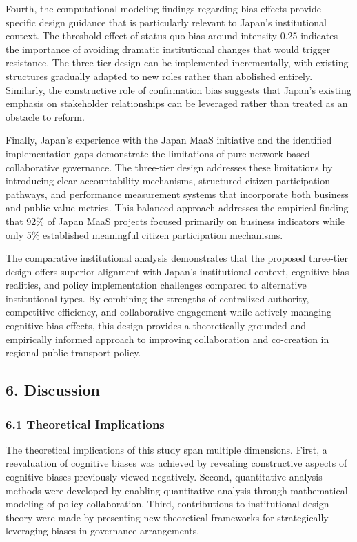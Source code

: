 Fourth, the computational modeling findings regarding bias effects
provide specific design guidance that is particularly relevant to
Japan's institutional context. The threshold effect of status quo bias
around intensity 0.25 indicates the importance of avoiding dramatic
institutional changes that would trigger resistance. The three-tier
design can be implemented incrementally, with existing structures
gradually adapted to new roles rather than abolished entirely.
Similarly, the constructive role of confirmation bias suggests that
Japan's existing emphasis on stakeholder relationships can be leveraged
rather than treated as an obstacle to reform.

Finally, Japan's experience with the Japan MaaS initiative and the
identified implementation gaps demonstrate the limitations of pure
network-based collaborative governance. The three-tier design addresses
these limitations by introducing clear accountability mechanisms,
structured citizen participation pathways, and performance measurement
systems that incorporate both business and public value metrics. This
balanced approach addresses the empirical finding that 92\% of Japan
MaaS projects focused primarily on business indicators while only 5\%
established meaningful citizen participation mechanisms.

The comparative institutional analysis demonstrates that the proposed
three-tier design offers superior alignment with Japan's institutional
context, cognitive bias realities, and policy implementation challenges
compared to alternative institutional types. By combining the strengths
of centralized authority, competitive efficiency, and collaborative
engagement while actively managing cognitive bias effects, this design
provides a theoretically grounded and empirically informed approach to
improving collaboration and co-creation in regional public transport
policy.

\subsection{6. Discussion}\label{discussion}

\subsubsection{6.1 Theoretical
Implications}\label{theoretical-implications}

The theoretical implications of this study span multiple dimensions.
First, a reevaluation of cognitive biases was achieved by revealing
constructive aspects of cognitive biases previously viewed negatively.
Second, quantitative analysis methods were developed by enabling
quantitative analysis through mathematical modeling of policy
collaboration. Third, contributions to institutional design theory were
made by presenting new theoretical frameworks for strategically
leveraging biases in governance arrangements.

